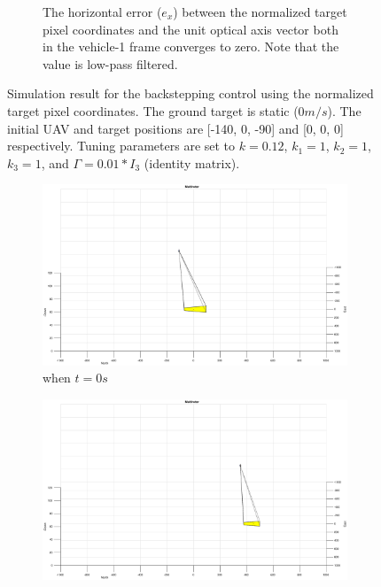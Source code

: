 \begin{figure}[htbp]
\begin{subfigure}[t]{0.8\linewidth}
		\caption{The horizontal error ($e_x$) between the normalized target pixel coordinates and the unit optical axis vector both in the vehicle-1 frame converges to zero. Note that the value is low-pass filtered.}
	\end{subfigure}	
	\caption{Simulation result for the backstepping control using the normalized target pixel coordinates. The ground target is static ($0m/s$). The initial UAV and target positions are [-140, 0, -90] and [0, 0, 0] respectively. Tuning parameters are set to $k=0.12$, $k_1=1$, $k_2=1$, $k_3=1$, and $\Gamma=0.01*I_3$ (identity matrix).}
	\label{image_0mps}
\end{figure}

\begin{figure}[htbp]
	\centering
	\begin{subfigure}[t]{0.32\linewidth}
		\includegraphics[width=\textwidth]{images/chapter4/image_UAV_5mps}
		\caption{when $t=0s$}
	\end{subfigure}
	\begin{subfigure}[t]{0.32\linewidth}
		\includegraphics[width=\textwidth]{images/chapter4/image_UAV_5mps_90s}

\end{subfigure}
\end{figure}
